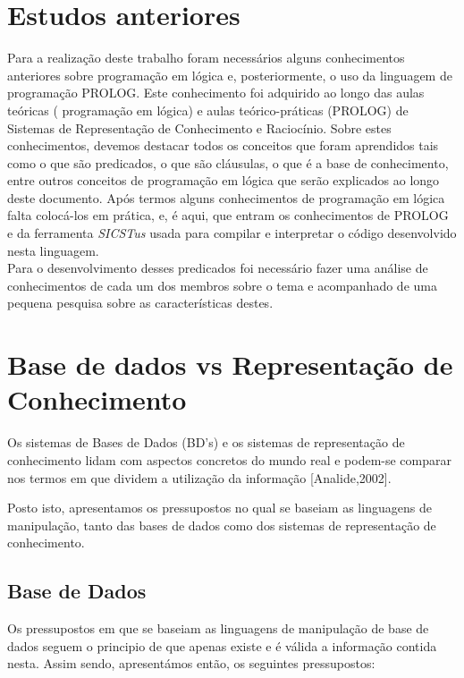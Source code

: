 \section{Estudos anteriores}
\label{p2:estudp}
Para a realização deste trabalho foram necessários alguns conhecimentos anteriores sobre programação em lógica e, posteriormente, o uso da linguagem de programação PROLOG.
Este conhecimento foi adquirido ao longo das aulas teóricas ( programação em lógica) e aulas teórico-práticas (PROLOG) de Sistemas de Representação de Conhecimento e Raciocínio.
Sobre estes conhecimentos, devemos destacar todos os conceitos que foram aprendidos tais como o que são predicados, o que são cláusulas, o que é a base de conhecimento, entre outros conceitos de programação em lógica que serão explicados ao longo deste documento.
Após termos alguns conhecimentos de programação em lógica falta colocá-los em prática, e, é aqui, que entram os conhecimentos de PROLOG e da ferramenta \textit{SICSTus} usada para
compilar e interpretar o código desenvolvido nesta linguagem.
\\

Para o desenvolvimento desses predicados foi necessário fazer uma análise de conhecimentos de cada um dos membros sobre o tema e acompanhado de uma pequena pesquisa sobre as características destes.




\section{Base de dados vs Representação de Conhecimento}
\label{p2:bdrepreconh}

Os sistemas de Bases de Dados (BD’s) e os sistemas de representação de conhecimento lidam com aspectos concretos do mundo real e podem-se comparar nos termos em que dividem a utilização da informação [Analide,2002].

Posto isto, apresentamos os pressupostos no qual se baseiam as linguagens de manipulação, tanto das bases de dados como dos sistemas de representação de conhecimento.

\subsection{Base de Dados}
Os pressupostos em que se baseiam as linguagens de manipulação de base de dados seguem o principio de que apenas existe e é válida a informação contida nesta. Assim sendo, apresentámos então, os seguintes pressupostos:

